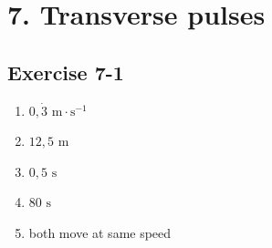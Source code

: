 \section {7. Transverse pulses}
\subsection{Exercise 7-1} 
\begin{multicols}{4}
\begin{enumerate}[noitemsep, label=\textbf{\arabic*}. ]
\item %
$0,\dot{3} \text{ m}\cdot \text{s}^{-1}$
\item %
$12,5 \text{ m}$
\item %
$0,5 \text{ s}$
\item %
$80 \text{ s}$
\item %
both move at same speed
\end{enumerate}
\end{multicols}

